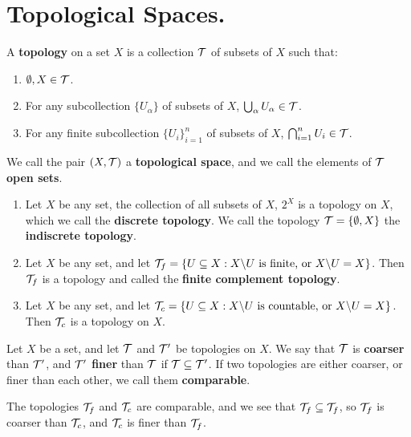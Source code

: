 
\section{Topological Spaces.}

\begin{definition}
    A \textbf{topology} on a set $X$ is a collection  $\mathcal{T}$ of subsets of  $X$ such that: 
        \begin{enumerate}[label=(\arabic*)]
            \item $\emptyset, X \in \mathcal{T}$.

            \item For any subcollection $\{U_{\alpha}\}$ of subsets of $X$,  $\bigcup_{\alpha}{U_{\alpha}} \in \mathcal{T}$.

            \item  For any finite subcollection $\{U_i\}_{i=1}^{n}$ of subsets of $X$, 
                $\bigcap_{i=1}^{n}{U_i} \in \mathcal{T}$.
        \end{enumerate}
        We call the pair $(X,\mathcal{T})$ a \textbf{topological space}, and we call the elements 
        of  $\mathcal{T}$ \textbf{open sets}.
\end{definition}

\begin{example}
    \begin{enumerate}[label=(\arabic*)]
        \item Let $X$ be any set, the collection of all subsets of  $X$,  $2^X$ is a topology 
            on $X$, which we call the \textbf{discrete topology}. We call the topology  $\mathcal{T}=
            \{\emptyset, X\}$ the \textbf{indiscrete topology}.

        \item Let $X$ be any set, and let  $\mathcal{T}_f=\{U \subseteq X: X \backslash U \text{ is 
            finite, or } X \backslash U=X\}$. Then  $\mathcal{T}_f$ is a topology and called the 
            \textbf{finite complement topology}.

        \item Let $X$ be any set, and let  $\mathcal{T}_c=\{U \subseteq X: X \backslash U \text{ is 
            countable, or } X \backslash U=X\}$. Then  $\mathcal{T}_c$ is a topology on $X$.
    \end{enumerate}		
\end{example}

\begin{definition}
    Let $X$ be a set, and let $\mathcal{T}$ and  $\mathcal{T}'$ be topologies on  $X$. We say that 
    $\mathcal{T}$ is  \textbf{coarser} than $\mathcal{T}'$, and $\mathcal{T}'$ \textbf{finer} than $\mathcal{T}$ if  $\mathcal{T} \subseteq \mathcal{T}'$. 
    If two topologies are either coarser, or finer than each other, we call them \textbf{comparable}.
\end{definition}

\begin{example}
    The topologies $\mathcal{T}_f$ and  $\mathcal{T}_c$ are comparable, and we see that  $\mathcal{T}_f \subseteq \mathcal{T}_f$, so 
    $\mathcal{T}_f$ is coarser than  $\mathcal{T}_c$, and  $\mathcal{T}_c$ is finer than  $\mathcal{T}_f$.
\end{example} 
